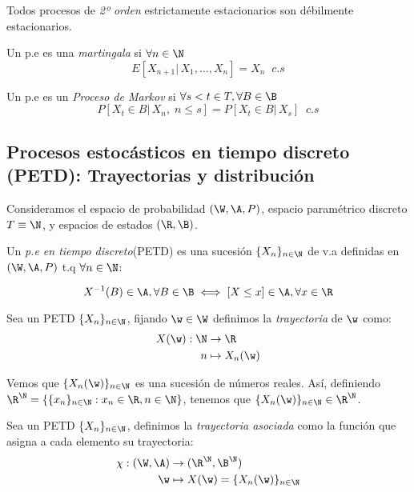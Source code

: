 \begin{nota}
  Todos procesos de \emph{2º orden} estrictamente estacionarios son débilmente estacionarios.
\end{nota}

\begin{ndef}
  Un p.e es una \emph{martingala} si $\forall n \in \N$ $$E[X_{n+1} | \, X_1, \ldots, X_n] = X_n \; \; c.s$$
\end{ndef}

\begin{ndef}
  Un p.e es un \emph{Proceso de Markov} si  $\forall s<t \in T, \forall B \in \B$ $$P[X_t \in B | \, X_n, \; n \leq s] = P[X_t \in B | \, X_s] \; \; c.s$$
\end{ndef}

\subsection{Procesos estocásticos en tiempo discreto (PETD): Trayectorias y distribución}

Consideramos el espacio de probabilidad $(\W, \A, P)$, espacio paramétrico discreto $T \equiv \N$, y espacios de estados $(\R, \B)$.

\begin{ndef}
  Un \emph{p.e en tiempo discreto}(PETD) es una sucesión $\{X_n\}_{n \in \N}$ de v.a definidas en $(\W, \A, P)$ t.q $\forall n \in \N$:

  $$X^{-1}(B) \in \A, \forall B \in \B \iff [X \leq x] \in \A, \forall x \in \R$$
\end{ndef}

\begin{ndef}
  Sea un PETD $\{X_n\}_{n \in \N}$, fijando $\w \in \W$ definimos la \emph{trayectoria} de $\w$ como:
  \begin{align*}
    X(\w): \N & \to \R \\
    n & \mapsto X_n(\w)
  \end{align*}

\end{ndef}

Vemos que $\{X_n(\w)\}_{n\in\N}$ es una sucesión de números reales. Así, definiendo $\R^\N = \{ \{x_n\}_{n \in \N} : x_n \in \R, n \in \N\}$, tenemos que $\{X_n(\w)\}_{n \in \N} \in \R^\N$.

\begin{ndef}
  Sea un PETD $\{X_n\}_{n \in \N}$, definimos la \emph{trayectoria asociada} como la función que asigna a cada elemento su trayectoria:
  \begin{align*}
    \chi : (\W, \A) & \to (\R^\N, \B^\N) \\
    \w & \mapsto X(\w) = \{X_n(\w)\}_{n \in \N}
  \end{align*}
\end{ndef}
